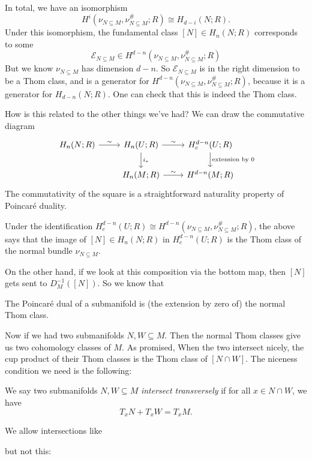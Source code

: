 \documentclass[a4paper]{article}
\theoremstyle{definition}
\begin{document}
In total, we have an isomorphism
\[
  H^i(\nu_{N \subseteq M}, \nu_{N \subseteq M}^\#; R) \cong H_{d - i}(N; R).
\]
Under this isomorphism, the fundamental class $[N] \in H_n(N; R)$ corresponds to some
\[
  \mathcal{E}_{N \subseteq M} \in H^{d - n}(\nu_{N \subseteq M}, \nu_{N \subseteq M}^\#; R)
\]
But we know $\nu_{N \subseteq M}$ has dimension $d - n$. So $\mathcal{E}_{N \subseteq M}$ is in the right dimension to be a Thom class, and is a generator for $H^{d - n}(\nu_{N \subseteq M}, \nu_{N \subseteq M}^\#; R)$, because it is a generator for $H_{d - n}(N; R)$. One can check that this is indeed the Thom class.

How is this related to the other things we've had? We can draw the commutative diagram
\[
  \begin{tikzcd}
    H_n(N; R) \ar[r, "\sim"] & H_n(U; R) \ar[r, "\sim"] \ar[d, "i_*"] & H_c^{d - n}(U; R) \ar[d, "\text{extension by }0"] \\
    & H_n(M; R) \ar[r, "\sim"] & H^{d - n}(M; R)
  \end{tikzcd}
\]
The commutativity of the square is a straightforward naturality property of Poincar\'e duality.

Under the identification $H_c^{d - n}(U; R) \cong H^{d - n}(\nu_{N \subseteq M}, \nu_{N \subseteq M}^\#; R)$, the above says that the image of $[N] \in H_n(N; R)$ in $H^{d - n}_c(U; R)$ is the Thom class of the normal bundle $\nu_{N \subseteq M}$.

On the other hand, if we look at this composition via the bottom map, then $[N]$ gets sent to $D_M^{-1}([N])$. So we know that
\begin{thm}
  The Poincar\'e dual of a submanifold is (the extension by zero of) the normal Thom class.
\end{thm}

Now if we had two submanifolds $N, W \subseteq M$. Then the normal Thom classes give us two cohomology classes of $M$. As promised, When the two intersect nicely, the cup product of their Thom classes is the Thom class of $[N \cap W]$. The niceness condition we need is the following:
\begin{defi}
  We say two submanifolds $N, W \subseteq M$ \emph{intersect transversely} if for all $x \in N \cap W$, we have
  \[
    T_x N + T_x W = T_x M.
  \]
\end{defi}

\begin{eg}
  We allow intersections like
  \begin{center}
  \end{center}
  but not this:
  \begin{center}
  \end{center}
\end{eg}
\end{document}
